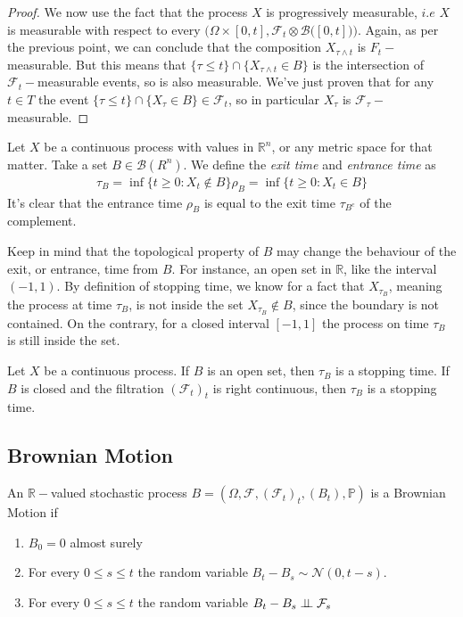 \begin{proof}
    We now use the fact that the process $X$ is progressively measurable, $i.e$ $X$ is measurable with respect to every $\big( \Omega \times [0,t], \mathcal{F}_t \otimes \mathcal{B}\big([0,t]\big)\big)$. Again, as per the previous point, we can conclude that the composition $X_{\tau \wedge t}$ is $F_t-$measurable. But this means that $\{ \tau \leq t \} \cap \{X_{\tau \wedge t} \in B \}$ is the intersection of $\mathcal{F}_t-$measurable events, so is also measurable. We've just proven that for any $t \in T$ the event $\{ \tau \leq t \} \cap \{X_{\tau} \in B \} \in \mathcal{F}_t$, so in particular $X_{\tau}$ is $\mathcal{F}_{\tau}-$measurable. 
\end{proof}

\begin{definition}
    Let $X$ be a continuous process with values in $\mathbb{R}^n$, or any metric space for that matter. Take a set $B \in \mathcal{B}(R^n)$. We define the \textit{exit time} and \textit{entrance time} as 
    \begin{gather*}
        \tau_B = \inf\big\{ t \geq 0 : X_t \notin B \big\}
        \rho_B = \inf\big\{ t \geq 0 : X_t \in B \big\}
    \end{gather*}
    It's clear that the entrance time $\rho_B$ is equal to the exit time $\tau_{B^c}$ of the complement.
\end{definition}

Keep in mind that the topological property of $B$ may change the behaviour of the exit, or entrance, time from $B$. For instance, an open set in $\mathbb{R}$, like the interval $(-1,1)$. By definition of stopping time, we know for a fact that $X_{\tau_B}$, meaning the process at time $\tau_B$, is not inside the set $X_{\tau_B} \notin B$, since the boundary is not contained. On the contrary, for a closed interval $[-1,1]$ the process on time $\tau_B$ is still inside the set. 

\begin{proposition}
    Let $X$ be a continuous process. If $B$ is an open set, then $\tau_B$ is a stopping time. If $B$ is closed and the filtration $(\mathcal{F}_t)_t$ is right continuous, then $\tau_B$ is a stopping time. 
\end{proposition}

\subsection{Brownian Motion}
\begin{definition}
    An $\mathbb{R}-$valued stochastic process $B = (\Omega, \mathcal{F}, (\mathcal{F}_t)_t, (B_t), \mathbb{P})$ is a Brownian Motion if 
    \begin{enumerate}
        \item $B_0 = 0$ almost surely
        \item For every $0 \leq s \leq t$ the random variable $B_t - B_s \sim \mathcal{N}(0,t-s)$.
        \item For every $0 \leq s \leq t$ the random variable $B_t - B_s \perp \!\!\! \perp \mathcal{F}_s$
    \end{enumerate}
\end{definition}

